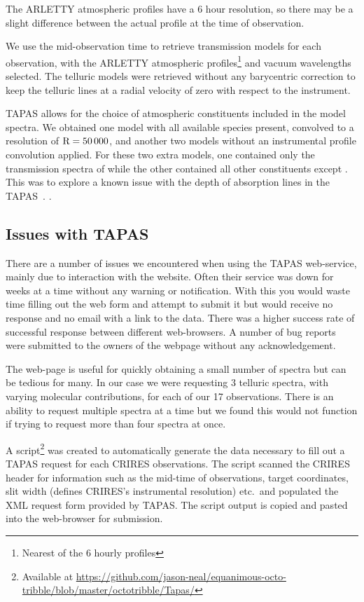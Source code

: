 The {ARLETTY} atmospheric profiles have a 6 hour resolution, so there may be a slight difference between the actual profile at the time of observation.

We use the mid-observation time to retrieve transmission models for each observation, with the {ARLETTY} atmospheric profiles\footnote{Nearest of the 6 hourly profiles} and vacuum wavelengths selected. The telluric models were retrieved without any barycentric correction to keep the telluric lines at a radial velocity of zero with respect to the instrument.

{TAPAS} allows for the choice of atmospheric constituents included in the model spectra. We obtained one model with all available species present, convolved to a resolution of \(\rm R=50\,000\), and another two models without an instrumental profile convolution applied. For these two extra models, one contained only the transmission spectra of  while the other contained all other constituents except . This was to explore a known issue with the depth of  absorption lines in the {TAPAS}~\citet{bertaux_tapas_2014}. .


\subsection{Issues with {TAPAS}}
There are a number of issues we encountered when using the {TAPAS} web-service, mainly due to interaction with the website. Often their service was down for weeks at a time without any warning or notification. With this you would waste time filling out the web form and attempt to submit it but would receive no response and no email with a link to the data. There was a higher success rate of successful response between different web-browsers. A number of bug reports were submitted to the owners of the webpage without any acknowledgement.

The web-page is useful for quickly obtaining a small number of spectra but can be tedious for many. In our case we were requesting 3 telluric spectra, with varying molecular contributions, for each of our 17 observations. There is an ability to request multiple spectra at a time but we found this would not function if trying to request more than four spectra at once.

A script\footnote{Available at \href{https://github.com/jason-neal/equanimous-octo-tribble/blob/master/octotribble/Tapas/}{https://github.com/jason-neal/equanimous-octo-tribble/blob/master/octotribble/Tapas/}} was created to automatically generate the data necessary to fill out a {TAPAS} request for each {CRIRES} observations. The script scanned the {CRIRES} header for information such as the mid-time of observations, target coordinates, slit width (defines {CRIRES}'s instrumental resolution) etc.\ and populated the {XML} request form provided by {TAPAS}. The script output is copied and pasted into the web-browser for submission.

